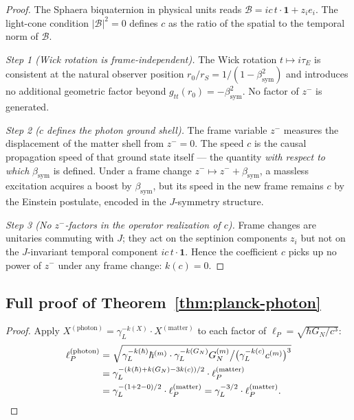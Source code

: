 \documentclass[12pt,a4paper]{article}
\newcommand{\bsym}{\beta_{\mathrm{sym}}}
\newcommand{\gL}{\gamma_L}
\newcommand{\lP}{\ell_P}
\newcommand{\zminus}{z^-}
\begin{document}
\begin{proof}
The Sphaera biquaternion in physical units reads
$\mathcal{B} = ic\,t\cdot\mathbf{1}+z_i e_i$.
The light-cone condition $|\mathcal{B}|^2=0$ defines $c$ as the ratio
of the spatial to the temporal norm of $\mathcal{B}$.

\emph{Step 1 (Wick rotation is frame-independent).}
The Wick rotation $t\mapsto i\tau_E$ is consistent at the natural
observer position $r_0/r_S=1/(1-\bsym^2)$ and introduces no additional
geometric factor beyond $g_{tt}(r_0)=-\bsym^2$.
No factor of $\zminus$ is generated.

\emph{Step 2 ($c$ defines the photon ground shell).}
The frame variable $\zminus$ measures the displacement of the matter
shell from $\zminus=0$.
The speed $c$ is the causal propagation speed of that ground state
itself --- the quantity \emph{with respect to which} $\bsym$ is defined.
Under a frame change $\zminus\mapsto\zminus+\bsym$, a massless excitation
acquires a boost by $\bsym$, but its speed in the new frame remains $c$
by the Einstein postulate, encoded in the $J$-symmetry structure.

\emph{Step 3 (No $\zminus$-factors in the operator realization of $c$).}
Frame changes are unitaries commuting with $J$; they act on the septinion
components $z_i$ but not on the $J$-invariant temporal component
$ic\,t\cdot\mathbf{1}$.
Hence the coefficient $c$ picks up no power of $\zminus$ under any
frame change: $k(c)=0$.
\end{proof}

\subsection*{Full proof of Theorem~\ref{thm:planck-photon}}
\label{app:planck}

\begin{proof}
Apply $X^{(\mathrm{photon})}=\gL^{-k(X)}\cdot X^{(\mathrm{matter})}$
to each factor of $\lP=\sqrt{\hbar G_N/c^3}$:
\begin{align*}
  \lP^{(\mathrm{photon})}
  &= \sqrt{
       \gL^{-k(\hbar)}\hbar^{(m)}
       \cdot\gL^{-k(G_N)}G_N^{(m)}
       \big/
       \bigl(\gL^{-k(c)}c^{(m)}\bigr)^3
     }\\
  &= \gL^{-(k(\hbar)+k(G_N)-3k(c))/2}
     \cdot\lP^{(\mathrm{matter})}\\
  &= \gL^{-(1+2-0)/2}\cdot\lP^{(\mathrm{matter})}
   = \gL^{-3/2}\cdot\lP^{(\mathrm{matter})}.\qedhere
\end{align*}
\end{proof}
\end{document}
